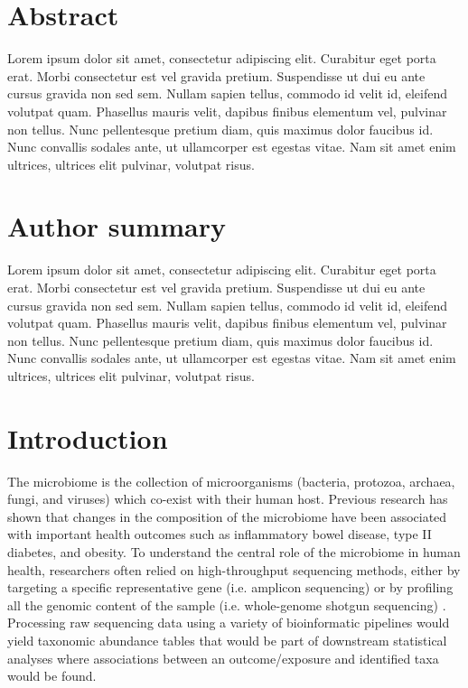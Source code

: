 \documentclass[10pt,letterpaper]{article}
\begin{document}
\section*{Abstract}
Lorem ipsum dolor sit amet, consectetur adipiscing elit. Curabitur eget porta erat. Morbi consectetur est vel gravida pretium. Suspendisse ut dui eu ante cursus gravida non sed sem. Nullam sapien tellus, commodo id velit id, eleifend volutpat quam. Phasellus mauris velit, dapibus finibus elementum vel, pulvinar non tellus. Nunc pellentesque pretium diam, quis maximus dolor faucibus id. Nunc convallis sodales ante, ut ullamcorper est egestas vitae. Nam sit amet enim ultrices, ultrices elit pulvinar, volutpat risus.


\section*{Author summary}
Lorem ipsum dolor sit amet, consectetur adipiscing elit. Curabitur eget porta erat. Morbi consectetur est vel gravida pretium. Suspendisse ut dui eu ante cursus gravida non sed sem. Nullam sapien tellus, commodo id velit id, eleifend volutpat quam. Phasellus mauris velit, dapibus finibus elementum vel, pulvinar non tellus. Nunc pellentesque pretium diam, quis maximus dolor faucibus id. Nunc convallis sodales ante, ut ullamcorper est egestas vitae. Nam sit amet enim ultrices, ultrices elit pulvinar, volutpat risus.

\linenumbers

\section*{Introduction}
The microbiome is the collection of microorganisms (bacteria, protozoa, archaea, fungi, and viruses) which co-exist with their human host. Previous research has shown that changes in the composition of the microbiome have been associated with important health outcomes such as inflammatory bowel disease, type II diabetes, and obesity. To understand the central role of the microbiome in human health, researchers often relied on high-throughput sequencing methods, either by targeting a specific representative gene (i.e. amplicon sequencing) or by profiling all the genomic content of the sample (i.e. whole-genome shotgun sequencing) \cite{cho2012}. Processing raw sequencing data using a variety of bioinformatic pipelines \cite{callahan2016,truong2015} would yield taxonomic abundance tables that would be part of downstream statistical analyses where associations between an outcome/exposure and identified taxa would be found.  
\end{document}
